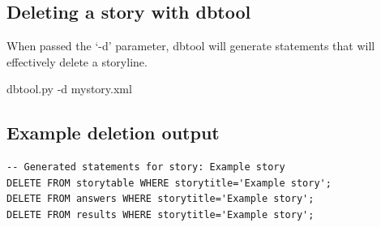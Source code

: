\documentclass[12pt,letterpaper]{article}
\begin{document}
 \subsection{Deleting a story with dbtool}
 When passed the `-d' parameter, dbtool will generate statements that will effectively delete a storyline. 
 
 \begin{center}
 dbtool.py -d mystory.xml
 \end{center}
 
 \subsection{Example deletion output}
 \begin{lstlisting}[breaklines=true]
-- Generated statements for story: Example story
DELETE FROM storytable WHERE storytitle='Example story';
DELETE FROM answers WHERE storytitle='Example story';
DELETE FROM results WHERE storytitle='Example story';
 \end{lstlisting}
 
\end{document}
